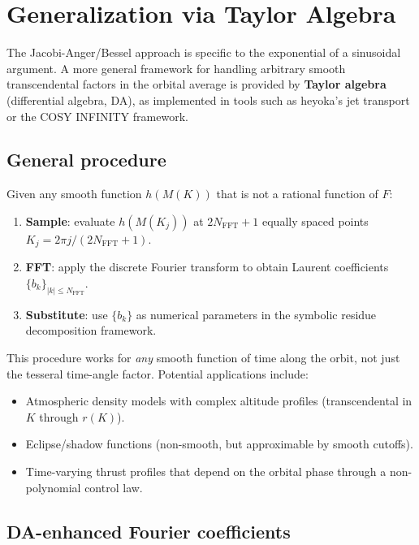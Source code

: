 \documentclass[11pt]{article}
\begin{document}
\section{Generalization via Taylor Algebra}
\label{sec:taylor_algebra}

The Jacobi-Anger/Bessel approach is specific to the exponential of a
sinusoidal argument. A more general framework for handling arbitrary
smooth transcendental factors in the orbital average is provided by
\textbf{Taylor algebra} (differential algebra, DA), as implemented in
tools such as heyoka's jet transport or the COSY INFINITY framework.

\subsection{General procedure}

Given any smooth function $h(M(K))$ that is not a rational function of
$F$:
\begin{enumerate}
\item \textbf{Sample}: evaluate $h(M(K_j))$ at $2N_{\mathrm{FFT}} + 1$
equally spaced points $K_j = 2\pi j / (2N_{\mathrm{FFT}} + 1)$.
\item \textbf{FFT}: apply the discrete Fourier transform to obtain
Laurent coefficients $\{b_k\}_{|k| \le N_{\mathrm{FFT}}}$.
\item \textbf{Substitute}: use $\{b_k\}$ as numerical parameters in the
symbolic residue decomposition framework.
\end{enumerate}

This procedure works for \emph{any} smooth function of time along the
orbit, not just the tesseral time-angle factor. Potential applications
include:
\begin{itemize}
\item Atmospheric density models with complex altitude profiles
(transcendental in $K$ through $r(K)$).
\item Eclipse/shadow functions (non-smooth, but approximable by smooth
cutoffs).
\item Time-varying thrust profiles that depend on the orbital phase
through a non-polynomial control law.
\end{itemize}

\subsection{DA-enhanced Fourier coefficients}
\end{document}
